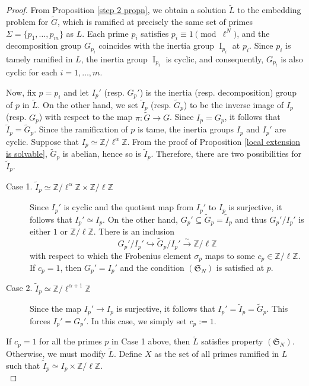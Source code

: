 \documentclass[11pt,reqno]{amsart}
\newcommand{\Z}{\mathbb{Z}}
\numberwithin{equation}{section}
\begin{document}
\begin{proof}
From Proposition \ref{step 2 propn}, we obtain a solution \(\widetilde{L}\) to the embedding problem for \(\widetilde{G}\), which is ramified at precisely the same set of primes \(\Sigma = \{p_1, \dots, p_m\}\) as \(L\). Each prime \(p_i\) satisfies \(p_i \equiv 1 \pmod{\ell^N}\), and the decomposition group \(G_{p_i}\) coincides with the inertia group \(\operatorname{I}_{p_i}\) at \(p_i\). Since \(p_i\) is tamely ramified in \(L\), the inertia group \(\operatorname{I}_{p_i}\) is cyclic, and consequently, \(G_{p_i}\) is also cyclic for each \(i = 1, \dots, m\).

Now, fix \(p = p_i\) and let $I_p'$ (resp. $G_p'$) is the inertia (resp. decomposition) group of $p$ in $\widetilde{L}$. On the other hand, we set $\widetilde{I}_p$ (resp. $\widetilde{G}_p$) to be the inverse image of $I_p$ (resp. $G_p$) with respect to the map $\pi: \widetilde{G}\rightarrow G$. Since $I_p=G_p$, it follows that $\widetilde{I}_p=\widetilde{G}_p$. Since the ramification of $p$ is tame, the inertia groups $I_p$ and $I_p'$ are cyclic. Suppose that \(I_p \simeq \mathbb{Z}/\ell^\alpha\mathbb{Z}\). From the proof of Proposition \ref{local extension is solvable}, $\widetilde{G}_p$ is abelian, hence so is $\widetilde{I}_p$. Therefore, there are two possibilities for \(\widetilde{I}_p\).
\begin{description}
    \item[Case 1. \(\widetilde{I}_p \simeq \mathbb{Z}/\ell^\alpha\mathbb{Z} \times \mathbb{Z}/\ell\mathbb{Z}\)] Since $I_p'$ is cyclic and the quotient map from $I_p'$ to $I_p$ is surjective, it follows that $I_p'\simeq I_p$. On the other hand, $G_p'\subseteq \widetilde{G}_p=\widetilde{I}_p$ and thus $G_p'/I_p'$ is either $1$ or $\Z/\ell \Z$. There is an inclusion
    \[G_p'/I_p'\hookrightarrow \widetilde{G}_p/I_p'\xrightarrow{\sim} \Z/\ell \Z\] with respect to which the Frobenius element \(\sigma_p\) maps to some \(c_p \in \mathbb{Z}/\ell\mathbb{Z}\). If \(c_p = 1\), then \(G_p' = I_p'\) and the condition \((\mathfrak{S}_N)\) is satisfied at \(p\). 
    \item[Case 2. \(\widetilde{I}_p \simeq \mathbb{Z}/\ell^{\alpha+1}\mathbb{Z}\)] Since the map $I_p'\rightarrow I_p$ is surjective, it follows that $I_p'=\widetilde{I}_p=\widetilde{G}_p$. This forces $I_p'=G_p'$. In this case, we simply set $c_p:=1$.
\end{description}
If \(c_p = 1\) for all the primes $p$ in Case 1 above, then \(\widetilde{L}\) satisfies property \((\mathfrak{S}_N)\). Otherwise, we must modify \(\widetilde{L}\). Define $X$ as the set of all primes ramified in \(L\) such that $\widetilde{I}_p\simeq I_p\times \Z/\ell \Z$. \\


\end{proof}
\end{document}
